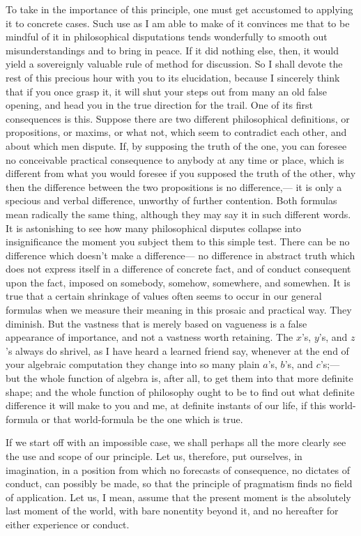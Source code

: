 \documentclass[12pt]{article}
\begin{document}
To take in the importance of this principle, one must get accustomed to applying it to concrete cases. Such use as I am able to make of it convinces me that to be mindful of it in philosophical disputations tends wonderfully to smooth out misunderstandings and to bring in peace. If it did nothing else, then, it would yield a sovereignly valuable rule of method for discussion. So I shall devote the rest of this precious hour with you to its elucidation, because I sincerely think that if you once grasp it, it will shut your steps out from many an old false opening, and head you in the true direction for the trail. One of its first consequences is this. Suppose there are two different philosophical definitions, or propositions, or maxims, or what not, which seem to contradict each other, and about which men dispute. If, by supposing the truth of the one, you can foresee no conceivable practical consequence to anybody at any time or place, which is different from what you would foresee if you supposed the truth of the other, why then the difference between the two propositions is no difference,--- it is only a specious and verbal difference, unworthy of further contention. Both formulas mean radically the same thing, although they may say it in such different words. It is astonishing to see how many philosophical disputes collapse into insignificance the moment you subject them to this simple test. There can be no difference which doesn't make a difference--- no difference in abstract truth which does not express itself in a difference of concrete fact, and of conduct consequent upon the fact, imposed on somebody, somehow, somewhere, and somewhen. It is true that a certain shrinkage of values often seems to occur in our general formulas when we measure their meaning in this prosaic and practical way. They diminish. But the vastness that is merely based on vagueness is a false appearance of importance, and not a vastness worth retaining. The $x$'s, $y$'s, and $z$'s always do shrivel, as I have heard a learned friend say, whenever at the end of your algebraic computation they change into so many plain $a$'s, $b$'s, and $c$'s;--- but the whole function of algebra is, after all, to get them into that more definite shape; and the whole function of philosophy ought to be to find out what definite difference it will make to you and me, at definite instants of our life, if this world-formula or that world-formula be the one which is true. 

If we start off with an impossible case, we shall perhaps all the more clearly see the use and scope of our principle. Let us, therefore, put ourselves, in imagination, in a position from which no forecasts of consequence, no dictates of conduct, can possibly be made, so that the principle of pragmatism finds no field of application. Let us, I mean, assume that the present moment is the absolutely last moment of the world, with bare nonentity beyond it, and no hereafter for either experience or conduct. 
\end{document}
